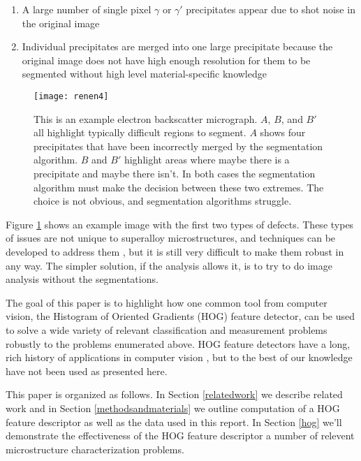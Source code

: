 \documentclass[review]{elsarticle}
\begin{document}
		\begin{enumerate}
			\item \label{prob1} A large number of single pixel $\gamma$ or $\gamma'$ precipitates appear due to shot noise in the original image
			\item Individual precipitates are merged into one large precipitate because the original image does not have high enough resolution for them to be segmented without high level material-specific knowledge
		\end{enumerate}
	
		\begin{figure}[!ht]
	  		\centering
			\texttt{[image: renen4]}
	  		\caption{ This is an example electron backscatter micrograph. $A$, $B$, and $B'$ all highlight typically difficult regions to segment. $A$ shows four precipitates that have been incorrectly merged by the segmentation algorithm. $B$ and $B'$ highlight areas where maybe there is a precipitate and maybe there isn't. In both cases the segmentation algorithm must make the decision between these two extremes. The choice is not obvious, and segmentation algorithms struggle. }
	  		\label{figure1}
		\end{figure}

		Figure \ref{figure1} shows an example image with the first two types of defects. These types of issues are not unique to superalloy microstructures, and techniques can be developed to address them \cite{comer, marc1, marc2, marc3}, but it is still very difficult to make them robust in any way. The simpler solution, if the analysis allows it, is to try to do image analysis without the segmentations.
	

		The goal of this paper is to highlight how one common tool from computer vision, the Histogram of Oriented Gradients (HOG) feature detector, can be used to solve a wide variety of relevant classification and measurement problems robustly to the problems enumerated above. HOG feature detectors have a long, rich history of applications in computer vision \cite{gradtex, hog, girsh}, but to the best of our knowledge have not been used as presented here.

		This paper is organized as follows. In Section \ref{relatedwork} we describe related work and in Section \ref{methodsandmaterials} we outline computation of a HOG feature descriptor as well as the data used in this report. In Section \ref{hog} we'll demonstrate the effectiveness of the HOG feature descriptor a number of relevent microstructure characterization problems.
	
\end{document}

